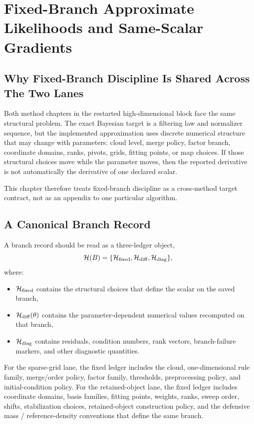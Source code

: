 \chapter{Fixed-Branch Approximate Likelihoods and Same-Scalar Gradients}
\label{ch:bf-highdim-fixed-branch-same-scalar}
\label{ch:bf-highdim-hmc-research}
\label{eq:bf-hd-hmc-potential}
\label{prop:bf-hd-hmc-gradient-contract}

\section{Why Fixed-Branch Discipline Is Shared Across The Two Lanes}
\label{sec:bf-hd-fixed-branch-purpose}

Both method chapters in the restarted high-dimensional block face the same
structural problem.  The exact Bayesian target is a filtering law and normalizer
sequence, but the implemented approximation uses discrete numerical structure
that may change with parameters: cloud level, merge policy, factor branch,
coordinate domains, ranks, pivots, grids, fitting points, or map choices.  If
those structural choices move while the parameter moves, then the reported
derivative is not automatically the derivative of one declared scalar.

This chapter therefore treats fixed-branch discipline as a cross-method target
contract, not as an appendix to one particular algorithm.

\section{A Canonical Branch Record}
\label{sec:bf-hd-branch-record}

A branch record should be read as a three-ledger object,
\begin{equation}
  \mathcal H(B)=\{\mathcal H_{\rm fixed},\mathcal H_{\rm diff},\mathcal H_{\rm diag}\},
  \label{eq:bf-hd-branch-ledger}
\end{equation}
where:
\begin{itemize}[leftmargin=0.28in]
  \item \(\mathcal H_{\rm fixed}\) contains the structural choices that define the
  scalar on the saved branch,
  \item \(\mathcal H_{\rm diff}(\theta)\) contains the parameter-dependent numerical
  values recomputed on that branch,
  \item \(\mathcal H_{\rm diag}\) contains residuals, condition numbers, rank
  vectors, branch-failure markers, and other diagnostic quantities.
\end{itemize}
For the sparse-grid lane, the fixed ledger includes the cloud, one-dimensional
rule family, merge/order policy, factor family, thresholds, preprocessing
policy, and initial-condition policy.  For the retained-object lane, the fixed
ledger includes coordinate domains, basis families, fitting points, weights,
ranks, sweep order, shifts, stabilization choices, retained-object construction
policy, and the defensive mass / reference-density conventions that define the
same branch.

